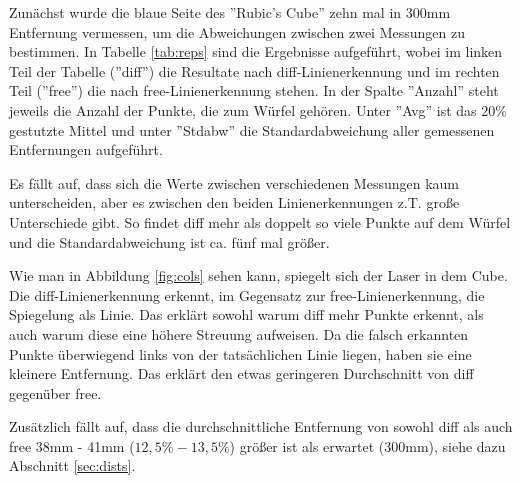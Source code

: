 \documentclass[ngerman,a4paper,parskip=half]{scrartcl}
\begin{document}
Zunächst wurde die blaue Seite des ''Rubic's Cube'' zehn mal in 300mm Entfernung vermessen, um die Abweichungen zwischen zwei Messungen zu bestimmen. In Tabelle \ref{tab:reps} sind die Ergebnisse aufgeführt, wobei im linken Teil der Tabelle (''diff'') die Resultate nach diff-Linienerkennung und im rechten Teil (''free'') die nach free-Linienerkennung stehen. In der Spalte ''Anzahl'' steht jeweils die Anzahl der Punkte, die zum Würfel gehören. Unter ''Avg'' ist das $20 \%$ gestutzte Mittel und unter ''Stdabw'' die Standardabweichung aller gemessenen Entfernungen aufgeführt.

Es fällt auf, dass sich die Werte zwischen verschiedenen Messungen kaum unterscheiden, aber es zwischen den beiden Linienerkennungen z.T. große Unterschiede gibt. So findet diff mehr als doppelt so viele Punkte auf dem Würfel und die Standardabweichung ist ca. fünf mal größer.

Wie man in Abbildung \ref{fig:cols} sehen kann, spiegelt sich der Laser in dem Cube. Die diff-Linienerkennung erkennt, im Gegensatz zur free-Linienerkennung, die Spiegelung als Linie. Das erklärt sowohl warum diff mehr Punkte erkennt, als auch warum diese eine höhere Streuung aufweisen. Da die falsch erkannten Punkte überwiegend links von der tatsächlichen Linie liegen, haben sie eine kleinere Entfernung. Das erklärt den etwas geringeren Durchschnitt von diff gegenüber free.

Zusätzlich fällt auf, dass die durchschnittliche Entfernung von sowohl diff als auch free 38mm - 41mm ($12,5\%-13,5\%$) größer ist als erwartet (300mm), siehe dazu Abschnitt \ref{sec:dists}.
\end{document}
